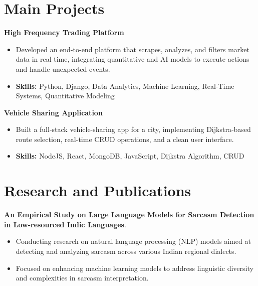 \documentclass[a4paper,11pt]{article}
\begin{document}
\section{\textbf{Main Projects}}

\vspace{1mm}
  \textbf{High Frequency Trading Platform  }
\vspace{-1.5mm} %
\begin{itemize}
  \item Developed an end-to-end platform that scrapes, analyzes, and filters market data in real time, integrating quantitative and AI models to execute actions and handle unexpected events.
\vspace{-3mm}
  \item \textbf{Skills:} Python, Django, Data Analytics, Machine Learning, Real-Time Systems, Quantitative Modeling
\end{itemize}


\vspace{1mm}
   \textbf{Vehicle Sharing Application }
\vspace{-1.5mm} %
\begin{itemize}
  \item Built a full-stack vehicle-sharing app for a city, implementing Dijkstra-based route selection, real-time CRUD operations, and a clean user interface.
\vspace{-3mm}
  \item \textbf{Skills:} NodeJS, React, MongoDB, JavaScript, Dijkstra Algorithm, CRUD
\end{itemize}



\section{\textbf{Research and Publications} \hfill }
\vspace{1mm}
  \textbf{An Empirical Study on Large Language Models for Sarcasm Detection in Low-resourced Indic Languages}.
\vspace{-1mm} %
\begin{itemize}
  \item Conducting research on natural language processing (NLP) models aimed at detecting and analyzing sarcasm across various Indian regional dialects.
\vspace{-3mm}
  \item Focused on enhancing machine learning models to address linguistic diversity and complexities in sarcasm interpretation.
\end{itemize}
\end{document}
